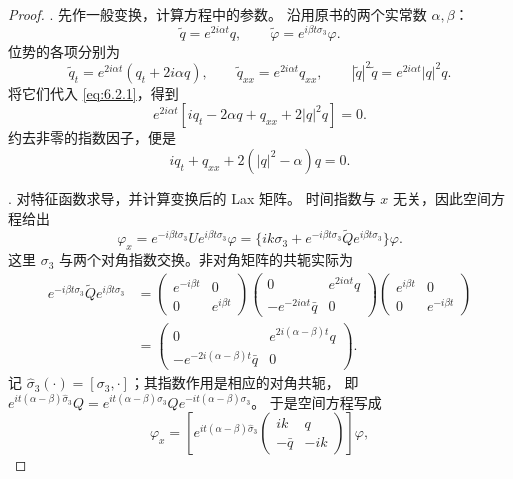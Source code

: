 \documentclass[lang=cn,scheme=chinese,mode=simple,device=normal,color=blue,
math=cm,thmcnt=section,12pt]{elegantbook}
\newcommand{\eqq}[2]{\tag{#1}\label{eq:#1}#2}
\begin{document}
\begin{proof}
    {. 先作一般变换，计算方程中的参数。}
    沿用原书的两个实常数 $\alpha,\beta$：
    \begin{equation}\eqq{6.2.9}{\widetilde q=e^{2i\alpha t}q,\qquad\widetilde\varphi=e^{i\beta t\sigma_3}\varphi.}\end{equation}
    位势的各项分别为
    \[
        \widetilde q_t=e^{2i\alpha t}(q_t+2i\alpha q),\qquad
        \widetilde q_{xx}=e^{2i\alpha t}q_{xx},\qquad
        |\widetilde q|^2\widetilde q=e^{2i\alpha t}|q|^2q.
    \]
    将它们代入 \eqref{eq:6.2.1}，得到
    \[
        e^{2i\alpha t}[iq_t-2\alpha q+q_{xx}+2|q|^2q]=0.
    \]
    约去非零的指数因子，便是
    \begin{equation}\eqq{6.2.10}{iq_t+q_{xx}+2(|q|^2-\alpha)q=0.}\end{equation}

    {. 对特征函数求导，并计算变换后的 Lax 矩阵。}
    时间指数与 $x$ 无关，因此空间方程给出
    \[
        \varphi_x=e^{-i\beta t\sigma_3}Ue^{i\beta t\sigma_3}\varphi
        =\{ik\sigma_3+e^{-i\beta t\sigma_3}\widetilde Qe^{i\beta t\sigma_3}\}\varphi.
    \]
    这里 $\sigma_3$ 与两个对角指数交换。非对角矩阵的共轭实际为
    \[
        \begin{aligned}
            e^{-i\beta t\sigma_3}\widetilde Qe^{i\beta t\sigma_3}
             & =\begin{pmatrix}e^{-i\beta t}&0\\0&e^{i\beta t}\end{pmatrix}
            \begin{pmatrix}0&e^{2i\alpha t}q\\-e^{-2i\alpha t}\bar q&0\end{pmatrix}
            \begin{pmatrix}e^{i\beta t}&0\\0&e^{-i\beta t}\end{pmatrix}                                \\
             & =\begin{pmatrix}0&e^{2i(\alpha-\beta)t}q\\-e^{-2i(\alpha-\beta)t}\bar q&0\end{pmatrix}.
        \end{aligned}
    \]
    记 $\widehat\sigma_3(\cdot)=[\sigma_3,\cdot]$；其指数作用是相应的对角共轭，
    即 $e^{it(\alpha-\beta)\widehat\sigma_3}Q
        =e^{it(\alpha-\beta)\sigma_3}Qe^{-it(\alpha-\beta)\sigma_3}$。
    于是空间方程写成
    \begin{equation}
        \eqq{6.2.11}{\varphi_x=\left[e^{it(\alpha-\beta)\widehat\sigma_3}
                \begin{pmatrix}ik&q\\-\bar q&-ik\end{pmatrix}\right]\varphi,}
    \end{equation}


\end{proof}
\end{document}
